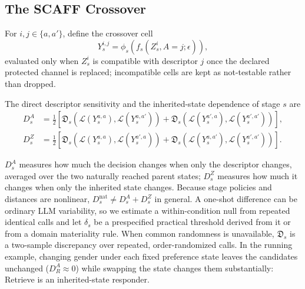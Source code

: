 \documentclass[runningheads]{llncs}
\newcommand{\Dist}{\mathfrak{D}}
\newcommand{\calL}{\mathcal{L}}
\begin{document}
\subsection{The SCAFF Crossover}

For $i,j\in\{a,a'\}$, define the crossover cell
\begin{equation}
\label{eq:crossovercell}
Y_s^{i,j}=\phi_s\!\left(f_s(Z_s^i,A=j;\epsilon)\right),
\end{equation}
evaluated only when $Z_s^i$ is compatible with descriptor $j$ once the declared protected
channel is replaced; incompatible cells are kept as not-testable rather than dropped.

\begin{definition}
The direct descriptor sensitivity and the inherited-state dependence of stage $s$ are
\begin{align}
\label{eq:direct}
D_s^A &= \tfrac{1}{2}\!\left[\Dist_s\!\left(\calL(Y_s^{a,a}),\calL(Y_s^{a,a'})\right)
 + \Dist_s\!\left(\calL(Y_s^{a',a}),\calL(Y_s^{a',a'})\right)\right],\\
\label{eq:state}
D_s^Z &= \tfrac{1}{2}\!\left[\Dist_s\!\left(\calL(Y_s^{a,a}),\calL(Y_s^{a',a})\right)
 + \Dist_s\!\left(\calL(Y_s^{a,a'}),\calL(Y_s^{a',a'})\right)\right].
\end{align}
\end{definition}

\noindent $D_s^A$ measures how much the decision changes when only the descriptor changes,
averaged over the two naturally reached parent states; $D_s^Z$ measures how much it changes when
only the inherited state changes. Because stage policies and distances are nonlinear,
$D_s^{\mathrm{nat}}\neq D_s^A+D_s^Z$ in general. A one-shot difference can be ordinary LLM
variability, so we estimate a within-condition null from repeated identical calls and let
$\delta_s$ be a prespecified practical threshold derived from it or from a domain materiality
rule. When common randomness is unavailable, $\Dist_s$ is a two-sample discrepancy over
repeated, order-randomized calls. In the running example, changing gender under each fixed
preference state leaves the candidates unchanged ($D_R^A\approx0$) while swapping the state
changes them substantially: Retrieve is an inherited-state responder.
\end{document}
